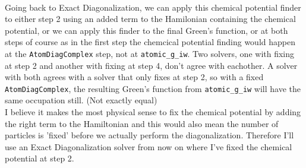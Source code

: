 \documentclass[12pt]{article}
\begin{document}
\\
Going back to Exact Diagonalization, we can apply this chemical potential finder to either step 2 using an added term to the Hamilonian containing the chemical potential, or we can apply this finder to the final Green's function, or at both steps of course as in the first step the chemcical potential finding would happen at the \texttt{AtomDiagComplex} step, not at \texttt{atomic\_g\_iw}. Two solvers, one with fixing at step 2 and another with fixing at step 4, don't agree with eachother. A solver with both agrees with a solver that only fixes at step 2, so with a fixed \texttt{AtomDiagComplex}, the resulting Green's function from \texttt{atomic\_g\_iw} will have the same occupation still. (Not exactly equal)\\
I believe it makes the most physical sense to fix the chemical potential by adding the right term to the Hamiltonian and this would also mean the number of particles is 'fixed' before we actually perform the diagonalization. Therefore I'll use an Exact Diagonalization solver from now on where I've fixed the chemical potential at step 2.
\end{document}
